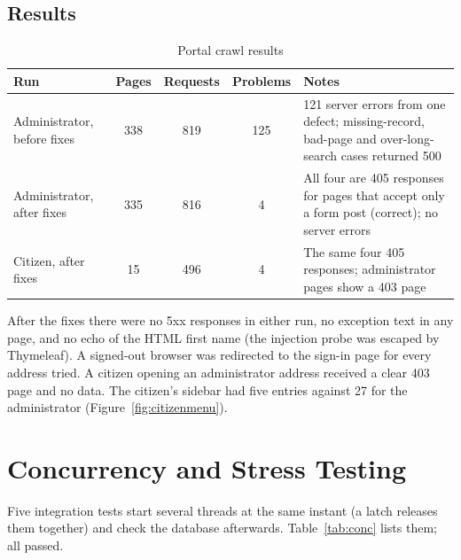 \subsection{Results}
\begin{table}[H]
\centering\small
\caption{Portal crawl results}\label{tab:crawl}
\begin{tabularx}{\linewidth}{@{}p{4.3cm}cccX@{}}
\toprule \textbf{Run} & \textbf{Pages} & \textbf{Requests} & \textbf{Problems} & \textbf{Notes}\\ \midrule
Administrator, before fixes & 338 & 819 & 125 & 121 server errors from one defect; missing-record, bad-page and over-long-search cases returned 500\\
Administrator, after fixes & 335 & 816 & 4 & All four are 405 responses for pages that accept only a form post (correct); no server errors\\
Citizen, after fixes & 15 & 496 & 4 & The same four 405 responses; administrator pages show a 403 page\\
\bottomrule
\end{tabularx}
\end{table}
After the fixes there were no 5xx responses in either run, no exception text in any page,
and no echo of the HTML first name (the injection probe was escaped by Thymeleaf). A
signed-out browser was redirected to the sign-in page for every address tried. A
citizen opening an administrator address received a clear 403 page and no data. The
citizen's sidebar had five entries against 27 for the administrator
(Figure~\ref{fig:citizenmenu}).

\section{Concurrency and Stress Testing}\label{sec:conc}
Five integration tests start several threads at the same instant (a latch releases them
together) and check the database afterwards. Table~\ref{tab:conc} lists them; all passed.

